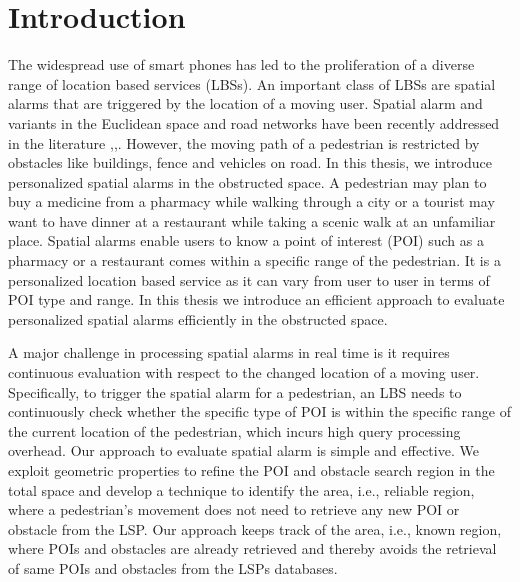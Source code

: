 
\chapter{Introduction}
\label{chap:intro}

The widespread use of smart phones has led to the proliferation of a diverse range of location based services (LBSs). An important class of LBSs are spatial alarms that are triggered by the location of a moving user. Spatial alarm and variants in the Euclidean space and road networks have been recently addressed in the literature \cite{bamba},\cite{mur},\cite{roadalarm}. However, the moving path of a pedestrian is restricted by obstacles like buildings, fence and vehicles on road. In this thesis, we introduce personalized spatial alarms in the obstructed space. A pedestrian may plan to buy a medicine from a pharmacy while walking through a city or a tourist may want to have dinner at a restaurant while taking a scenic walk at an unfamiliar place. Spatial alarms enable users to know a point of interest (POI) such as a pharmacy or a restaurant comes within a specific range of the pedestrian. It is a personalized location based service as it can vary from user to user in terms of POI type and range. In this thesis we introduce an efficient approach to evaluate personalized spatial alarms efficiently in the obstructed space.

\vspace*{10pt}
A major challenge in processing spatial alarms in real time is it requires continuous evaluation with respect to the changed location of a moving user. Specifically, to trigger the spatial alarm for a pedestrian, an LBS needs to continuously check whether the specific type of POI is within the specific range of the current location of the pedestrian, which incurs high query processing overhead. Our approach to evaluate spatial alarm is simple and effective. We exploit geometric properties to refine the POI and obstacle search region in the total space and develop a technique to identify the area, i.e., reliable region, where a pedestrian's movement does not need to retrieve any new POI or obstacle from the LSP. Our approach keeps track of the area, i.e., known region, where POIs and obstacles are already retrieved and thereby avoids the retrieval of same POIs and obstacles from the LSPs databases. 
\vspace{10pt}

